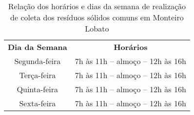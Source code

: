 \begin{table}[htbp]
  \centering
  \caption{Relação dos horários e dias da semana de realização de coleta dos resíduos sólidos comuns em Monteiro Lobato}
    \begin{tabular}{c|c}
    \rowcolor[rgb]{ .969,  .588,  .275} \textcolor[rgb]{ 1,  1,  1}{\textbf{Dia da Semana}} & \textcolor[rgb]{ 1,  1,  1}{\textbf{Horários}} \\
    \rowcolor[rgb]{ .992,  .914,  .851} Segunda-feira & 7h às 11h – almoço – 12h às 16h \\
    \rowcolor[rgb]{ .984,  .831,  .706} Terça-feira & 7h às 11h – almoço – 12h às 16h \\
    \rowcolor[rgb]{ .992,  .914,  .851} Quinta-feira & 7h às 11h – almoço – 12h às 16h \\
    \rowcolor[rgb]{ .984,  .831,  .706} Sexta-feira & 7h às 11h – almoço – 12h às 16h \\
    \end{tabular}%
  \label{tab:dias_coleta}%
\end{table}%
